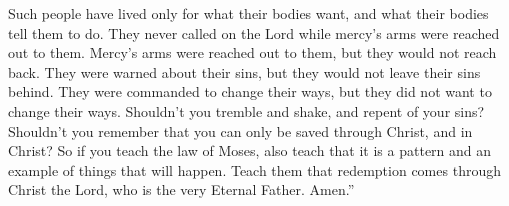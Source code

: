 Such people have lived only for what their bodies want, and what their bodies tell them to do. They never called on the Lord while mercy's arms were reached out to them. Mercy's arms were reached out to them, but they would not reach back. They were warned about their sins, but they would not leave their sins behind. They were commanded to change their ways, but they did not want to change their ways.
\bverse \iffalse And now, ought ye not to tremble and repent of your sins, and remember that only in and through Christ ye can be saved? \fi
Shouldn't you tremble and shake, and repent of your sins? Shouldn't you remember that you can only be saved through Christ, and in Christ?
\bverse \iffalse Therefore, if ye teach the law of Moses, also teach that it is a shadow of those things which are to come-- \fi
So if you teach the law of Moses, also teach that it is a pattern and an example of things that will happen.
\bverse \iffalse Teach them that redemption cometh through Christ the Lord, who is the very Eternal Father. Amen. \fi
Teach them that redemption comes through Christ the Lord, who is the very Eternal Father. Amen.''

